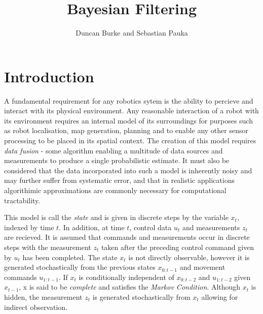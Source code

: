 \documentclass[english]{article}
\begin{document}
\title{Bayesian Filtering}

\author{Duncan Burke and Sebastian Pauka}
\maketitle


\section*{Introduction}


A fundamental requirement for any robotics sytem is the ability to percieve and interact with its physical environment. Any reasonable interaction of a robot with its environment requires an internal model of its surroundings for purposes such as robot localisation, map generation, planning and to enable any other sensor processing to be placed in its spatial context. The creation of this model requires \emph{data fusion} - some algorithm  enabling a multitude of data sources and measurements to produce a single probabilistic estimate. It must also be considered that the data incorporated into such a model is inherently noisy and may further suffer from systematic error, and that in realistic applications algorithimic approximations are commonly necessary for computational tractability\cite{probrob}.

This model is call the \emph{state} and is given in discrete steps by the variable $x_t$, indexed by time $t$. In addition, at time $t$, control data $u_t$ and measurements $z_t$ are recieved. It is assumed that commands and measurements occur in discrete steps with the measurement $z_t$ taken after the preceding control command given by $u_t$ has been completed. The state $x_t$ is not directly observable, however it is generated stochastically from the previous states $x_{0:t-1}$ and movement commands $u_{1:t-1}$\cite{Thrun02d}. If  $x_t$ is conditionally independent of $x_{0:t-2}$ and $u_{1:t-2}$ given $x_{t-1}$, x is said to be \emph{complete} and satisfies the \emph{Markov Condition}\cite{probrob}. Although $x_t$ is hidden, the measurement $z_t$ is generated stochastically from $x_t$ allowing for indirect observation\cite{Thrun02d}.
\end{document}
